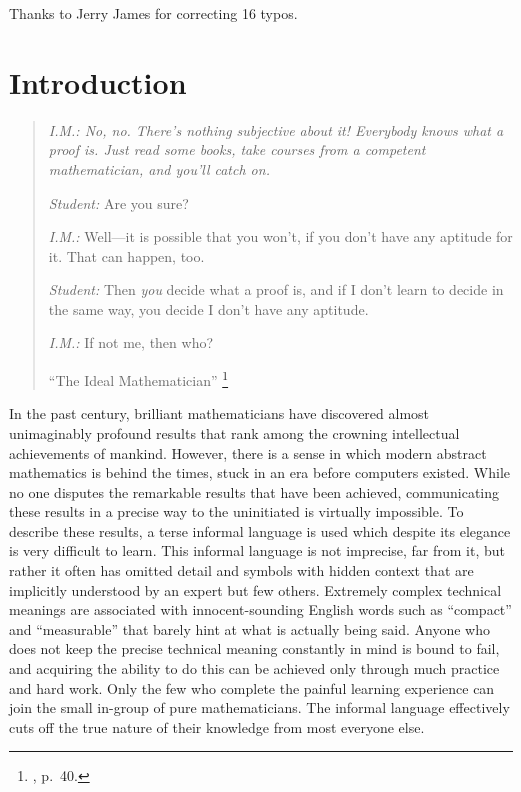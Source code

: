 Thanks to Jerry James for correcting 16 typos.

\chapter{Introduction}

\begin{quotation}
  {\em {\em I.M.:}  No, no.  There's nothing subjective about it!  Everybody
knows what a proof is.  Just read some books, take courses from a competent
mathematician, and you'll catch on.

{\em Student:}  Are you sure?

{\em I.M.:}  Well---it is possible that you won't, if you don't have any
aptitude for it.  That can happen, too.

{\em Student:}  Then {\em you} decide what a proof is, and if I don't learn
to decide in the same way, you decide I don't have any aptitude.

{\em I.M.:}  If not me, then who?}
    \flushright\sc  ``The Ideal Mathematician''
    \footnote{\cite{Davis}, p.~40.}\\
\end{quotation}

In the past century, brilliant mathematicians have discovered almost
unimaginably profound results that rank among the crowning intellectual
achievements of mankind.  However, there is a sense in which modern abstract
mathematics is behind the times, stuck in an era before computers existed.
While no one disputes the remarkable results that have been achieved,
communicating these results in a precise way to the uninitiated is virtually
impossible.  To describe these results, a terse informal language is used which
despite its elegance is very difficult to learn.  This informal language is not
imprecise, far from it, but rather it often has omitted detail
and symbols with hidden context that are
implicitly understood by an expert but few others.  Extremely complex technical
meanings are associated with innocent-sounding English words such as
``compact'' and ``measurable'' that barely hint at what is actually being
said.  Anyone who does not keep the precise technical meaning constantly in
mind is bound to fail, and acquiring the ability to do this can be achieved
only through much practice and hard work.  Only the few who complete the
painful learning experience can join the small in-group of pure
mathematicians.  The informal language effectively cuts off the true nature of
their knowledge from most everyone else.

